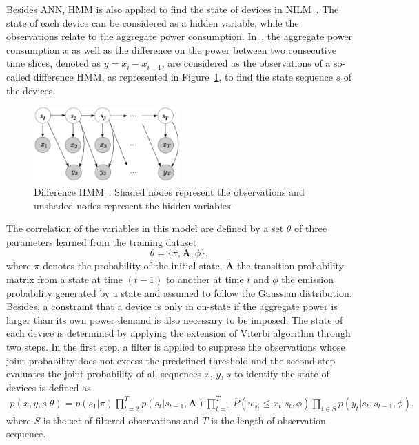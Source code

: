 Besides ANN, HMM is also applied to find the state of devices in NILM~\cite{Parson12,Kim11ICDM,Kolter11redd,Nambi13,Lukaszewski13,Zoha13,Jia15,Ridi14}. The state of each device can be considered as a hidden variable, while the observations relate to the aggregate power consumption. In~\cite{Parson12}, the aggregate power consumption $x$ as well as the difference on the power between two consecutive time slices, denoted as $y=x_i-x_{i-1}$, are considered as the observations of a so-called difference HMM, as represented in Figure~\ref{fig:A11}, to find the state sequence $s$ of the devices.
\begin{figure}
\centering
\includegraphics[width=0.5\textwidth]{./chapters/chapter2/images/HMM.pdf} 
\caption{Difference HMM~\cite{Parson12}. Shaded nodes represent the observations and unshaded nodes represent the hidden variables.} 
\label{fig:A11} 
\end{figure}
The correlation of the variables in this model are defined by a set $\theta$ of three parameters learned from the training dataset 
\begin{equation}
\theta = \{\pi ,\mathbf{A},\phi\},
\end{equation}
where $\pi$ denotes the probability of the initial state, $\mathbf{A}$ the transition probability matrix from a state at time $(t-1)$ to another at time $t$ and $\phi$ the emission probability generated by a state and assumed to follow the Gaussian distribution. Besides, a constraint that a device is only in on-state if the aggregate power is larger than its own power demand is also necessary to be imposed.
The state of each device is determined by applying the extension of Viterbi algorithm through two steps. In the first step, a filter is applied to suppress the observations whose joint probability does not excess the predefined threshold and the second step evaluates the joint probability of all sequences $x$, $y$, $s$ to identify the state of devices is defined as
\begin{equation}
\begin{split}
p(x,y,s|\theta)=p(s_1|\pi)\prod_{t=2}^{T}{p(s_t|s_{t-1},\mathbf{A})}
\prod_{t=1}^{T}{P(w_{s_t}\leq x_t|s_t,\phi)}\prod_{t\in S}{p(y_t|s_t,s_{t-1},\phi)},
\end{split}
\end{equation}
where $S$ is the set of filtered observations and $T$ is the length of observation sequence.


